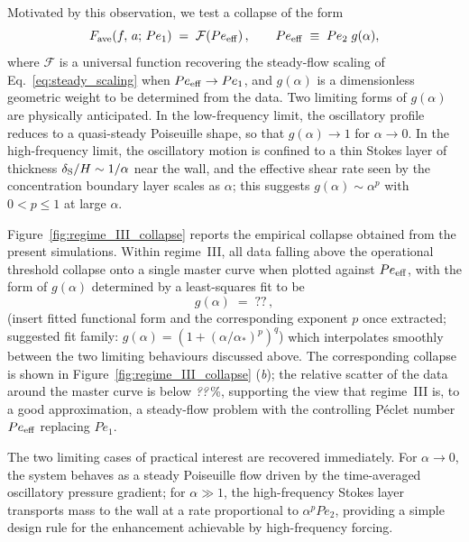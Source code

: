 \documentclass[lineno]{JFM-FLM_Au}
\begin{document}
Motivated by this observation, we test a collapse of the form
\begin{equation}
F_{\rm ave}(f,\, a;\, Pe_{1}) \;=\; \mathcal{F}\!\left( Pe_{\rm eff} \right),
\qquad
Pe_{\rm eff} \;\equiv\; Pe_{2}\; g(\alpha),
\label{eq:regime_III_collapse}
\end{equation}
where $\mathcal{F}$ is a universal function recovering the steady-flow
scaling of Eq.~\eqref{eq:steady_scaling} when $Pe_{\rm eff} \to Pe_{1}$,
and $g(\alpha)$ is a dimensionless geometric weight to be determined
from the data. Two limiting forms of $g(\alpha)$ are physically
anticipated. In the low-frequency limit, the oscillatory profile reduces
to a quasi-steady Poiseuille shape, so that
$g(\alpha) \to 1$ for $\alpha \to 0$. In the high-frequency limit, the
oscillatory motion is confined to a thin Stokes layer of thickness
$\delta_{\rm S}/H \sim 1/\alpha$ near the wall, and the effective shear
rate seen by the concentration boundary layer scales as $\alpha$; this
suggests $g(\alpha) \sim \alpha^{p}$ with $0 < p \le 1$ at large
$\alpha$.
 
Figure~\ref{fig:regime_III_collapse} reports the empirical collapse
obtained from the present simulations. Within regime~III, all data
falling above the operational threshold collapse onto a single master
curve when plotted against $Pe_{\rm eff}$, with the form of $g(\alpha)$
determined by a least-squares fit to be
\begin{equation}
g(\alpha) \;=\; ??\,,
\label{eq:g_alpha_fit}
\end{equation}
{(insert fitted functional form and the corresponding
exponent $p$ once extracted; suggested fit family:
$g(\alpha) = (1+(\alpha/\alpha_{*})^{p})^{q}$)}
which interpolates smoothly between the two limiting behaviours
discussed above. The corresponding collapse is shown in
Figure~\ref{fig:regime_III_collapse} (\textit{b}); the relative scatter
of the data around the master curve is below \textit{??}\,\%, supporting
the view that regime~III is, to a good approximation, a steady-flow
problem with the controlling P\'{e}clet number $Pe_{\rm eff}$ replacing
$Pe_{1}$.
 
The two limiting cases of practical interest are recovered immediately.
For $\alpha \to 0$, the system behaves as a steady Poiseuille flow
driven by the time-averaged oscillatory pressure gradient; for
$\alpha \gg 1$, the high-frequency Stokes layer transports mass to the
wall at a rate proportional to $\alpha^{p} Pe_{2}$, providing a simple
design rule for the enhancement achievable by high-frequency
forcing.
 
\end{document}
